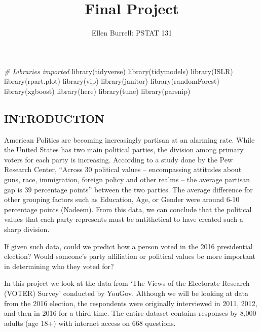 \documentclass[
]{article}
\title{Final Project}
\author{Ellen Burrell: PSTAT 131}
\date{}
\newenvironment{Shaded}{\begin{snugshade}}{\end{snugshade}}
\newcommand{\CommentTok}[1]{\textcolor[rgb]{0.56,0.35,0.01}{\textit{#1}}}
\newcommand{\FunctionTok}[1]{\textcolor[rgb]{0.00,0.00,0.00}{#1}}
\newcommand{\NormalTok}[1]{#1}
\begin{document}
\maketitle

{
\setcounter{tocdepth}{2}
\tableofcontents
}
\begin{Shaded}
\begin{Highlighting}[]
\CommentTok{\# Libraries imported}
\FunctionTok{library}\NormalTok{(tidyverse)}
\FunctionTok{library}\NormalTok{(tidymodels)}
\FunctionTok{library}\NormalTok{(ISLR)}
\FunctionTok{library}\NormalTok{(rpart.plot)}
\FunctionTok{library}\NormalTok{(vip)}
\FunctionTok{library}\NormalTok{(janitor)}
\FunctionTok{library}\NormalTok{(randomForest)}
\FunctionTok{library}\NormalTok{(xgboost)}
\FunctionTok{library}\NormalTok{(here)}
\FunctionTok{library}\NormalTok{(tune)}
\FunctionTok{library}\NormalTok{(parsnip)}
\end{Highlighting}
\end{Shaded}

\hypertarget{introduction}{%
\subsection{INTRODUCTION}\label{introduction}}

American Politics are becoming increasingly partisan at an alarming
rate. While the United States has two main political parties, the
division among primary voters for each party is increasing. According to
a study done by the Pew Research Center, ``Across 30 political values --
encompassing attitudes about guns, race, immigration, foreign policy and
other realms -- the average partisan gap is 39 percentage points''
between the two parties. The average difference for other grouping
factors such as Education, Age, or Gender were around 6-10 percentage
points (Nadeem). From this data, we can conclude that the political
values that each party represents must be antithetical to have created
such a sharp division.

If given such data, could we predict how a person voted in the 2016
presidential election? Would someone's party affiliation or political
values be more important in determining who they voted for?

In this project we look at the data from `The Views of the Electorate
Research (VOTER) Survey' conducted by YouGov. Although we will be
looking at data from the 2016 election, the respondents were originally
interviewed in 2011, 2012, and then in 2016 for a third time. The entire
dataset contains responses by 8,000 adults (age 18+) with internet
access on 668 questions.
\end{document}
